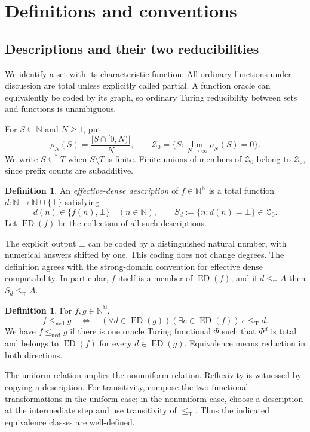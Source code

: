 \documentclass[11pt,a4paper]{article}
\newcommand{\N}{\mathbb N}
\newcommand{\Baire}{\N^{\N}}
\newcommand{\leT}{\leq_{\mathrm T}}
\newcommand{\ned}{\mathrm{ned}}
\newcommand{\ued}{\mathrm{ued}}
\newcommand{\leN}{\leq_{\ned}}
\newcommand{\leU}{\leq_{\ued}}
\newcommand{\ED}{\operatorname{ED}}
\newcommand{\Znull}{\mathcal Z_0}
\newcommand{\substar}{\subseteq^{*}}
\theoremstyle{definition}
\newtheorem{definition}[theorem]{Definition}
\theoremstyle{remark}
\begin{document}
\section{Definitions and conventions}
\label{cr14:sec:definitions}
\subsection{Descriptions and their two reducibilities}
We identify a set with its characteristic function. All ordinary functions
under discussion are total unless explicitly called partial. A function
oracle can equivalently be coded by its graph, so ordinary Turing
reducibility between sets and functions is unambiguous.

For $S\subseteq\N$ and $N\geq1$, put
\[
 \rho_N(S)=\frac{|S\cap[0,N)|}{N},\qquad
 \Znull=\{S:\lim_{N\to\infty}\rho_N(S)=0\}.
\]
We write $S\substar T$ when $S\setminus T$ is finite. Finite unions of
members of $\Znull$ belong to $\Znull$, since prefix counts are subadditive.

\begin{definition}
An \emph{effective-dense description} of $f\in\Baire$ is a total function
$d:\N\to\N\cup\{\bot\}$ satisfying
\[
 d(n)\in\{f(n),\bot\}\quad(n\in\N),\qquad
 S_d:=\{n:d(n)=\bot\}\in\Znull.
\]
Let $\ED(f)$ be the collection of all such descriptions.
\end{definition}

The explicit output $\bot$ can be coded by a distinguished natural number,
with numerical answers shifted by one. This coding does not change degrees.
The definition agrees with the strong-domain convention for effective dense
computability.\cite[Definitions~1.4 and~3.1]{AHJ}
In particular, $f$ itself is a member of $\ED(f)$, and if $d\leT A$ then
$S_d\leT A$.

\begin{definition}
For $f,g\in\Baire$,
\[
 f\leN g\quad\Longleftrightarrow\quad
 (\forall d\in\ED(g))(\exists e\in\ED(f))\ e\leT d.
\]
We have $f\leU g$ if there is one oracle Turing functional $\Phi$ such that
$\Phi^d$ is total and belongs to $\ED(f)$ for every $d\in\ED(g)$.
Equivalence means reduction in both directions.
\end{definition}

The uniform relation implies the nonuniform relation. Reflexivity is
witnessed by copying a description. For transitivity, compose the two
functional transformations in the uniform case; in the nonuniform case,
choose a description at the intermediate step and use transitivity of
$\leT$. Thus the indicated equivalence classes are well-defined.
\end{document}
